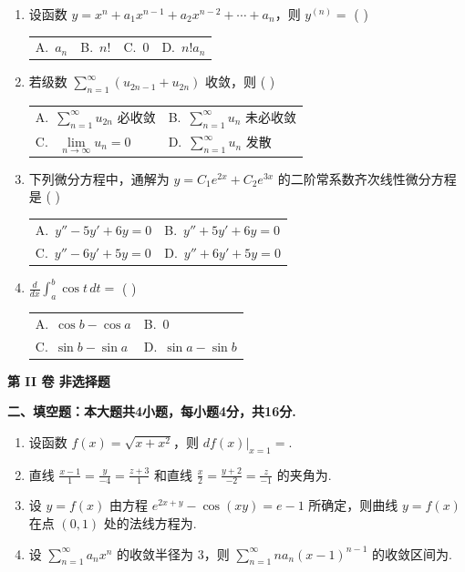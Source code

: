 \documentclass[12pt, a4paper]{article}
\makeatletter
\newcommand{\fourchoices}[4]{
    \par\noindent
    \begin{tabular*}{\linewidth}{@{\extracolsep{\fill}}llll}
        A.~#1 & B.~#2 & C.~#3 & D.~#4
    \end{tabular*}
}
\newcommand{\twochoices}[4]{
    \par\noindent
    \begin{tabular*}{\linewidth}{@{\extracolsep{\fill}}ll}
        A.~#1 & B.~#2 \\
        C.~#3 & D.~#4
    \end{tabular*}
}
\makeatother
\begin{document}
\begin{enumerate}[label=\arabic*、, itemsep=1.2em]
    \item 设函数 $y = x^n + a_1 x^{n-1} + a_2 x^{n-2} + \cdots + a_n$，则 $y^{(n)} = $ ( \quad )
    \fourchoices{$a_n$}{$n!$}{0}{$n!a_n$}
    
    \item 若级数 $\sum\limits_{n=1}^{\infty} (u_{2n-1} + u_{2n})$ 收敛，则 ( \quad )
    \twochoices{$\sum\limits_{n=1}^{\infty} u_{2n}$ 必收敛}{$\sum\limits_{n=1}^{\infty} u_n$ 未必收敛}{ $\lim\limits_{n \to \infty} u_n = 0$}{$\sum\limits_{n=1}^{\infty} u_n$ 发散}
    
    \item 下列微分方程中，通解为 $y = C_1e^{2x} + C_2e^{3x}$ 的二阶常系数齐次线性微分方程是 ( \quad )
    \twochoices{$y'' - 5y' + 6y = 0$}{$y'' + 5y' + 6y = 0$}{$y'' - 6y' + 5y = 0$}{$y'' + 6y' + 5y = 0$}
    
    \item $\frac{d}{dx} \int_a^b \cos t \, dt = $ ( \quad )
    \twochoices{$\cos b - \cos a$}{0}{$\sin b - \sin a$}{$\sin a - \sin b$}
\end{enumerate}

\newpage

\begin{center}
    \Large \textbf{第 II 卷 \quad 非选择题}
\end{center}

\noindent \textbf{二、填空题：本大题共4小题，每小题4分，共16分.}

\begin{enumerate}[label=\arabic*、, itemsep=2em, start=13]
    \item 设函数 $f(x) = \sqrt{x+x^2}$，则 $df(x)|_{x=1} = $\underline{\hspace{4cm}}.
    
    \item 直线 $\frac{x-1}{1} = \frac{y}{-4} = \frac{z+3}{1}$ 和直线 $\frac{x}{2} = \frac{y+2}{-2} = \frac{z}{-1}$ 的夹角为\underline{\hspace{4cm}}.
    
    \item 设 $y = f(x)$ 由方程 $e^{2x+y} - \cos(xy) = e - 1$ 所确定，则曲线 $y = f(x)$ 在点 $(0,1)$ 处的法线方程为\underline{\hspace{4cm}}.
    
    \item 设 $\sum\limits_{n=1}^{\infty} a_n x^n$ 的收敛半径为 3，则 $\sum\limits_{n=1}^{\infty} n a_n (x-1)^{n-1}$ 的收敛区间为\underline{\hspace{4cm}}.
\end{enumerate}
\end{document}
